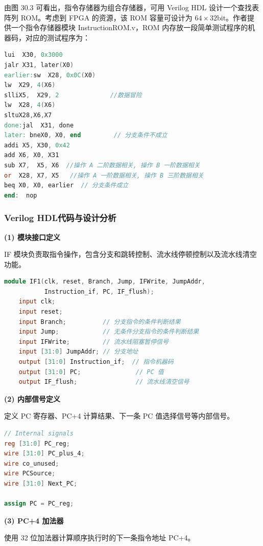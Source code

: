 \documentclass[12pt,a4paper]{article}
\begin{document}
由图 30.3 可看出，指令存储器为组合存储器，可用 Verilog HDL 设计一个查找表阵列 ROM。考虑到 FPGA 的资源，该 ROM 容量可设计为 $64\times32$bit。作者提供一个指令存储器模块 InstructionROM.v，ROM 内存放一段简单测试程序的机器码，对应的测试程序为：

\begin{lstlisting}[language=verilog]
lui  X30, 0x3000
jalr X31, later(X0)
earlier:sw  X28, 0x0C(X0)
lw  X29, 4(X6)
slliX5,  X29, 2              //数据冒险
lw  X28, 4(X6)
sltuX28,X6,X7
done:jal  X31, done
later: bneX0, X0, end         // 分支条件不成立
addi X5, X30, 0x42
add X6, X0, X31
sub X7,  X5, X6  //操作 A 二阶数据相关, 操作 B 一阶数据相关
or  X28, X7, X5   //操作 A 一阶数据相关, 操作 B 三阶数据相关
beq X0, X0, earlier  // 分支条件成立
end:  nop
\end{lstlisting}

\subsubsection{Verilog HDL代码与设计分析}

\textbf{(1) 模块接口定义}

IF 模块负责取指令操作，包含分支和跳转控制、流水线停顿控制以及流水线清空功能。

\begin{lstlisting}[language=verilog]
module IF1(clk, reset, Branch, Jump, IFWrite, JumpAddr, 
           Instruction_if, PC, IF_flush);
    input clk;
    input reset;
    input Branch;          // 分支指令的条件判断结果
    input Jump;            // 无条件分支指令的条件判断结果
    input IFWrite;         // 流水线阻塞暂停信号
    input [31:0] JumpAddr; // 分支地址
    output [31:0] Instruction_if;  // 指令机器码
    output [31:0] PC;               // PC 值
    output IF_flush;                // 流水线清空信号
\end{lstlisting}

\textbf{(2) 内部信号定义}

定义 PC 寄存器、PC+4 计算结果、下一条 PC 值选择信号等内部信号。

\begin{lstlisting}[language=verilog]
// Internal signals
reg [31:0] PC_reg;
wire [31:0] PC_plus_4;
wire co_unused;
wire PCSource;
wire [31:0] Next_PC;

assign PC = PC_reg;
\end{lstlisting}

\textbf{(3) PC+4 加法器}

使用 32 位加法器计算顺序执行时的下一条指令地址 PC+4。
\end{document}
